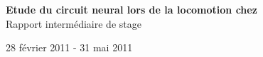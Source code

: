 
\vspace*{\fill}
\begin{center}
   \textbf{ {\Huge Etude du circuit neural lors de la locomotion chez \caeleg{}}}\\[0.5em]{\huge Rapport intermédiaire de stage}
\end{center}

\begin{center}
  28 février 2011 - 31 mai 2011
\end{center}

\vspace*{\fill}

\newpage
